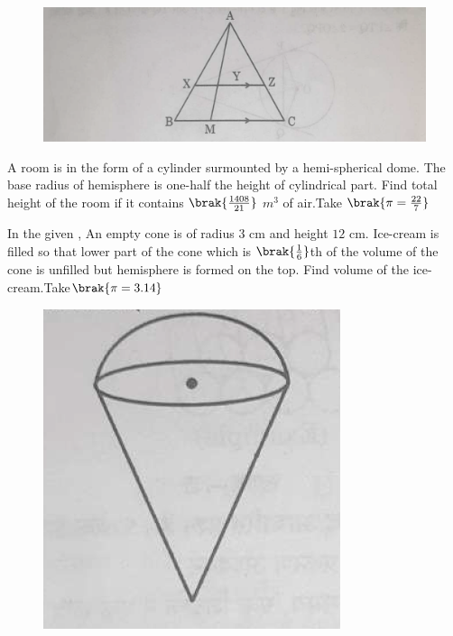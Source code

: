 \begin{figure}[H]
  \centering
  \includegraphics[width=\columnwidth]{figs/fig7.png}
  \caption{}
    \label{fig:fig7.png}
\end{figure}
\item A room is in the form of a cylinder surmounted by a hemi-spherical dome. The base radius of hemisphere is one-half the height of cylindrical part. Find total height of the room if it contains  $\brak{ \frac{1408}{21}}$ $m^3$ of air.Take $\brak{\pi= \frac{22}{7}}$
\item In the given , An empty cone is of radius $3$ cm and height $12$ cm. Ice-cream is filled so that lower part of the cone which is $\brak{\frac{1}{6}}$th
of the volume of the cone is unfilled but hemisphere is formed on the top. Find volume of the ice-cream.Take$\brak{\pi=3.14}$
\begin{figure}[H]
  \centering
  \includegraphics[width=\columnwidth]{figs/fig8.png}
  \caption{}
    \label{fig:fig8.png}
\end{figure}
